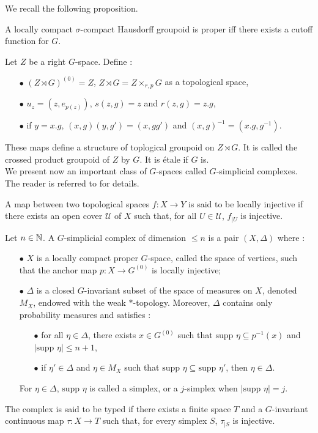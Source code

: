 We recall the following proposition.

\begin{prop}
A locally compact $\sigma$-compact Hausdorff groupoid is proper iff there exists a cutoff function for $G$. 
\end{prop}

Let $Z$ be a right $G$-space. Define :
\begin{itemize}
\item[$\bullet$] $(Z\rtimes G)^{(0)} = Z$, $Z\rtimes G = Z\times_{r,p} G$ as a topological space,
\item[$\bullet$] $u_{z}= (z,e_{p(z)})$, $ s(z,g) = z$ and $r(z,g)=z.g$, 
\item[$\bullet$] if $y = x.g$, $(x,g)(y,g')= (x,gg') $ and $(x,g)^{-1} = (x.g,g^{-1})$.
\end{itemize}

These maps define a structure of toplogical groupoid on $Z\rtimes G$. It is called the crossed product groupoid of $Z$ by $G$. It is étale if $G$ is.\\

We present now an important class of $G$-spaces called $G$-simplicial complexes. The reader is referred to \cite{TuBC2} for details. 

\begin{definition}
A map between two topological spaces $f : X\rightarrow Y$ is said to be locally injective if there exists an open cover $\mathcal U$ of $X$ such that, for all $U\in \mathcal U$, $f_{|U}$ is injective.
\end{definition}

\begin{definition} \label{Gcomplex}
Let $n\in\mathbb N$. A $G$-simplicial complex of dimension $\leq n$ is a pair $(X,\Delta)$ where :
\begin{itemize}
\item[$\bullet$] $X$ is a locally compact proper $G$-space, called the space of vertices, such that the anchor map $p : X\rightarrow G^{(0)}$ is locally injective;
\item[$\bullet$] $\Delta$ is a closed $G$-invariant subset of the space of measures on $X$, denoted $M_X$, endowed with the weak $*$-topology. Moreover, $\Delta$ contains only probability measures and satisfies :
\begin{itemize}
\item[$\bullet$] for all $\eta\in\Delta$, there exists $x\in G^ {(0)}$ such that $\text{supp }\eta \subseteq p^{-1}(x)$ and $|\text{supp }\eta|\leq n+1$,
\item[$\bullet$] if $\eta' \in \Delta$ and $\eta\in M_X$ such that $\text{supp }\eta \subseteq \text{supp }\eta'$, then $\eta\in \Delta$.
\end{itemize}
For $\eta\in \Delta$, $\text{supp }\eta$ is called a simplex, or a $j$-simplex when $|\text{supp }\eta | = j$.
\end{itemize}
The complex is said to be typed if there exists a finite space $T$ and a $G$-invariant continuous map $\tau : X\rightarrow T$ such that, for every simplex $S$, $\tau_{|S}$ is injective.  
\end{definition}

